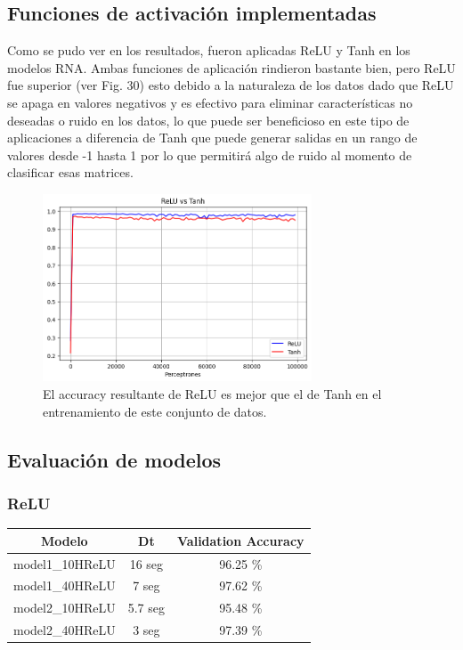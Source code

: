 \documentclass[journal]{IEEEtai}
\begin{document}
\subsection{Funciones de activación implementadas}

Como se pudo ver en los resultados, fueron aplicadas ReLU y Tanh en los modelos RNA. Ambas funciones de aplicación rindieron bastante bien, pero ReLU fue superior (ver Fig. 30) esto debido a la naturaleza de los datos dado que ReLU se apaga en valores negativos y es efectivo para eliminar características no deseadas o ruido en los datos, lo que puede ser beneficioso en este tipo de aplicaciones a diferencia de Tanh que puede generar salidas en un rango de valores desde -1 hasta 1 por lo que permitirá algo de ruido al momento de clasificar esas matrices.

\begin{figure}[h!]
\centering
\includegraphics[width=8cm]{img/exp/ReLUvsTanh.png}
\caption{El accuracy resultante de ReLU es mejor que el de Tanh en el entrenamiento de este conjunto de datos.}
\label{fig: ReLUvsTanh}
\end{figure}

\subsection{Evaluación de modelos}

\subsubsection{ReLU}

\hfill \break

\begin{tabular}{| c | c | c |}
\hline
Modelo & Dt & Validation Accuracy \\
\hline
model1\_10HReLU & 16 seg & 96.25 \% \\
model1\_40HReLU & 7 seg & 97.62 \% \\
model2\_10HReLU & 5.7 seg & 95.48 \% \\
model2\_40HReLU & 3 seg & 97.39 \% \\
\hline
\end{tabular} \\
\end{document}
